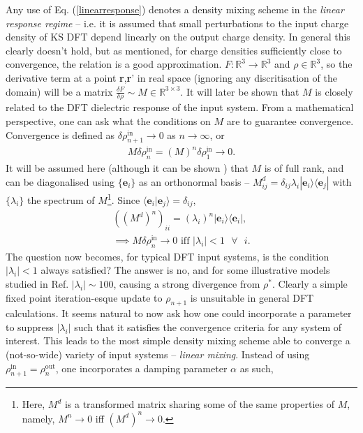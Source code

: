 Any use of Eq$.$ (\ref{linearresponse}) denotes a density mixing scheme in the \textit{linear response regime} -- i.e. it is assumed that small perturbations to the input charge density of KS DFT depend linearly on the output charge density. In general this clearly doesn't hold, but as mentioned, for charge densities sufficiently close to convergence, the relation is a good approximation. $F : \mathbb{R}^3 \rightarrow \mathbb{R}^3$ and $\rho \in \mathbb{R}^3$, so the derivative term at a point \textbf{r},\textbf{r}' in real space (ignoring any discritisation of the domain) will be a matrix $\frac{\delta F}{\delta \rho} \sim M \in \mathbb{R}^{3 \times 3}$. It will later be shown that $M$ is closely related to the DFT dielectric response of the input system. From a mathematical perspective, one can ask what the conditions on $M$ are to guarantee convergence. Convergence is defined as $\delta \rho^{\text{in}}_{n+1} \rightarrow 0$ as $n \rightarrow \infty$, or
\begin{gather}
M   \delta \rho^{\text{in}}_{n} = (M)^n \delta \rho^{\text{in}}_{1} \rightarrow 0.
\end{gather}
It will be assumed here (although it can be shown \citep{linear}) that $M$ is of full rank, and can be diagonalised using $\{  \textbf{e}_i \}$ as an orthonormal basis -- $M^d_{ij} =  \delta_{ij} \lambda_i | \textbf{e}_i \rangle \langle \textbf{e}_j |$ with $\{ \lambda_i \}$ the spectrum of $M$\footnote{Here, $M^d$ is a transformed matrix sharing some of the same properties of $M$, namely, $M^n \rightarrow 0$ iff $(M^d)^n \rightarrow 0$.}. Since $\langle \textbf{e}_i | \textbf{e}_j \rangle = \delta_{ij}$,
\begin{gather}
((M^d)^n)_{ii} = (\lambda_i)^n   | \textbf{e}_i \rangle \langle \textbf{e}_i |, \\
\implies M \delta \rho^{\text{in}}_n \rightarrow 0 \text{ iff } | \lambda_i | < 1 \text{ } \forall \text{ } i.
\end{gather} 
The question now becomes, for typical DFT input systems, is the condition $ | \lambda_i | < 1 $ always satisfied? The answer is no, and for some illustrative models studied in Ref$.$ \citep{linear} $| \lambda_i | \sim 100$, causing a strong divergence from $\rho^*$. Clearly a simple fixed point iteration-esque update to $\rho_{n+1}$ is unsuitable in general DFT calculations. It seems natural to now ask how one could incorporate a parameter to suppress $| \lambda_i |$ such that it satisfies the convergence criteria for any system of interest. This leads to the most simple density mixing scheme able to converge a (not-so-wide) variety of input systems -- \textit{linear mixing}. Instead of using $\rho^{\text{in}}_{n+1} = \rho^{\text{out}}_{n}$, one incorporates a damping parameter $\alpha$ as such,
